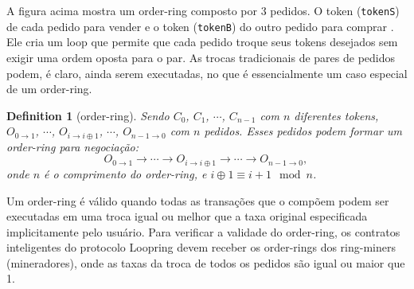 \documentclass[UTF8,nofonts]{article}
\makeatletter
\newtheorem{definition}{Definition}[section]
\newenvironment{figurehere}
 {\def\@captype{figure}}
 {}
\makeatother
\begin{document}
\begin{multicols}{2}
\begin{center}
\begin{figurehere}

\caption{order-ring de 3 pedidos}
\label{fig:ring}
\end{figurehere}
\end{center}


A figura acima mostra um order-ring composto por 3 pedidos. O token (\verb|tokenS|) de cada pedido para vender e o token (\verb|tokenB|) do outro pedido para comprar . Ele cria um loop que permite que cada pedido troque seus tokens desejados sem exigir uma ordem oposta para o par. As trocas tradicionais de pares de pedidos podem, é claro, ainda serem executadas, no que é essencialmente um caso especial de um order-ring.

\begin{definition}[order-ring] Sendo $C_{0}$, $C_{1}$, $\cdots$, $C_{n-1}$ com $n$ diferentes tokens, $O_{0\rightarrow 1}$, $\cdots$, $O_{i\rightarrow i\oplus 1}$, $\cdots$, $O_{n-1 \rightarrow 0}$ com $n$ pedidos. Esses pedidos podem formar um order-ring para negociação:
$$O_{0\rightarrow 1} \rightarrow \cdots \rightarrow O_{i\rightarrow i\oplus 1} \rightarrow \cdots \rightarrow O_{n-1\rightarrow 0} \text{, }$$
onde $n$ é o comprimento do order-ring, e $i\oplus 1 \equiv i+1 \mod n$.
\end{definition}

Um order-ring é válido quando todas as transações que o compõem podem ser executadas em uma troca igual ou melhor que a taxa original especificada implicitamente pelo usuário. Para verificar a validade do order-ring, os contratos inteligentes do protocolo Loopring devem receber os order-rings dos ring-miners (mineradores), onde as taxas da troca de todos os pedidos são igual ou maior que 1.


\end{multicols}
\end{document}
